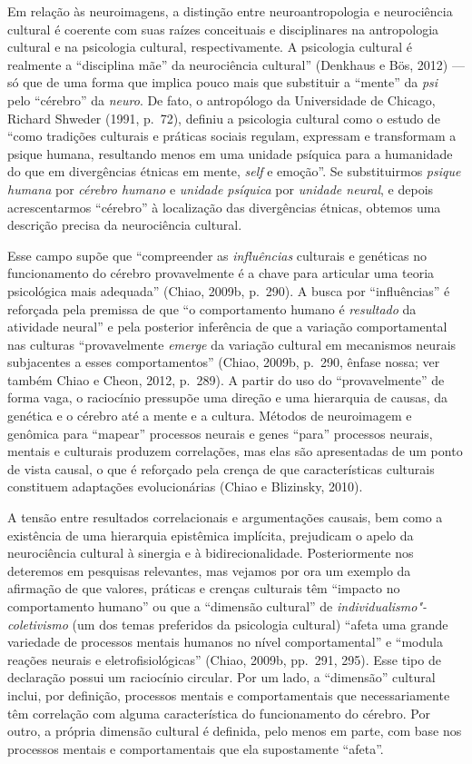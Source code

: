 Em relação às neuroimagens, a distinção entre neuroantropologia e
neurociência cultural é coerente com suas raízes conceituais e
disciplinares na antropologia cultural e na psicologia cultural,
respectivamente. A psicologia cultural é realmente a ``disciplina mãe''
da neurociência cultural'' (Denkhaus e Bös, 2012) --- só que de uma
forma que implica pouco mais que substituir a ``mente'' da \emph{psi}
pelo ``cérebro'' da \emph{neuro}. De fato, o antropólogo da Universidade
de Chicago, Richard Shweder (1991, p.~72), definiu a psicologia cultural
como o estudo de ``como tradições culturais e práticas sociais regulam,
expressam e transformam a psique humana, resultando menos em uma unidade
psíquica para a humanidade do que em divergências étnicas em mente, \emph{self}
e emoção''. Se substituirmos \emph{psique humana} por \emph{cérebro
humano} e \emph{unidade psíquica} por \emph{unidade neural}, e depois
acrescentarmos ``cérebro'' à localização das divergências étnicas,
obtemos uma descrição precisa da neurociência cultural.

Esse campo supõe que ``compreender as \emph{influências} culturais e
genéticas no funcionamento do cérebro provavelmente é a chave para
articular uma teoria psicológica mais adequada'' (Chiao, 2009b, p.~290).
A busca por ``influências'' é reforçada pela premissa de que ``o
comportamento humano é \emph{resultado} da atividade neural'' e pela
posterior inferência de que a variação comportamental nas culturas
``provavelmente \emph{emerge} da variação cultural em mecanismos neurais
subjacentes a esses comportamentos'' (Chiao, 2009b, p.~290, ênfase nossa;
ver também Chiao e Cheon, 2012, p.~289). A partir do uso do
``provavelmente'' de forma vaga, o raciocínio pressupõe uma direção e
uma hierarquia de causas, da genética e o cérebro até a mente e a
cultura. Métodos de neuroimagem e genômica para ``mapear'' processos
neurais e genes ``para'' processos neurais, mentais e culturais produzem
correlações, mas elas são apresentadas de um ponto de vista causal, o
que é reforçado pela crença de que características culturais constituem
adaptações evolucionárias (Chiao e Blizinsky, 2010).

A tensão entre resultados correlacionais e argumentações causais, bem
como a existência de uma hierarquia epistêmica implícita, prejudicam o
apelo da neurociência cultural à sinergia e à bidirecionalidade.
Posteriormente nos deteremos em pesquisas relevantes, mas vejamos por
ora um exemplo da afirmação de que valores, práticas e crenças culturais
têm ``impacto no comportamento humano'' ou que a ``dimensão cultural''
de \mbox{\emph{individualismo"-coletivismo}} (um dos temas preferidos da
psicologia cultural) ``afeta uma grande variedade de processos mentais
humanos no nível comportamental'' e ``modula reações neurais e
eletrofisiológicas'' (Chiao, 2009b, pp.~291, 295). Esse tipo de
declaração possui um raciocínio circular. Por um lado, a ``dimensão''
cultural inclui, por definição, processos mentais e comportamentais que
necessariamente têm correlação com alguma característica do
funcionamento do cérebro. Por outro, a própria dimensão cultural é
definida, pelo menos em parte, com base nos processos mentais e
comportamentais que ela supostamente ``afeta''.

